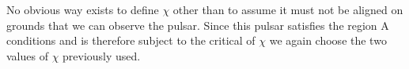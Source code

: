 \documentclass[/home/greg/Thesis/main/main.tex]{subfiles}
\begin{document}
No obvious way exists to define $\chi$ other than to assume it must not be aligned on grounds that we can observe the pulsar. Since this pulsar satisfies the region A conditions and is therefore subject to the critical of $\chi$ we again choose the two values of $\chi$ previously used.

\biblio
\end{document}
